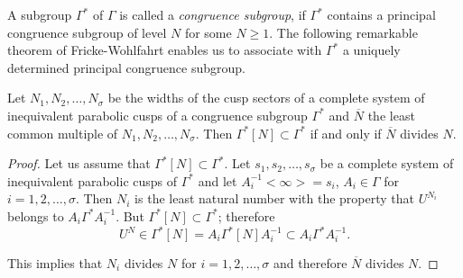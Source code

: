 A subgroup $\Gamma^{\ast}$ of $\Gamma$ is called a \textit{congruence
  subgroup}, if $\Gamma^{\ast}$ contains a principal congruence
subgroup of level $N$ for some $N \geq 1$. The following remarkable
theorem of Fricke-Wohlfahrt enables us to associate with
$\Gamma^{\ast}$ a uniquely determined principal congruence subgroup.

\begin{thm}\label{chap2:thm9}
Let $N_1, N_2, \ldots , N_{\sigma}$ be the widths of the cusp sectors
of a complete system of inequivalent parabolic cusps of a congruence
subgroup $\Gamma^{\ast}$ and $\overline{N}$ the least common multiple
of $N_1, N_2, \ldots,N_{\sigma}$. Then $\Gamma^{\ast}[N] \subset
\Gamma^{\ast}$ if and only if $\overline{N}$ divides $N$.
\end{thm}

\begin{proof}
Let us assume that $\Gamma^{\ast}[N] \subset \Gamma^{\ast}$. Let $s_1,
s_2, \ldots , s_{\sigma}$ be a complete system of inequivalent
parabolic cusps of $\Gamma^{\ast}$  and let $A^{-1}_i<\infty> = s_i$,
$A_i \in \Gamma$ for $i = 1,2, \ldots, \sigma$. Then $N_i$ is
the least natural number with the property that $U^{N_i}$ belongs to
$A_i \Gamma^{\ast} A^{-1}_i$. But $\Gamma^{\ast} [N] \subset
\Gamma^{\ast}$; therefore 
$$
U^N \in \Gamma^{\ast} [N] = A_i \Gamma^{\ast} [N] A^{-1}_i
\subset A_i \Gamma^{\ast} A^{-1}_i.
$$

This implies that $N_i$ divides $N$ for $i=1,2,\ldots, \sigma$ and
therefore $\overline{N}$ divides $N$.
\end{proof}

